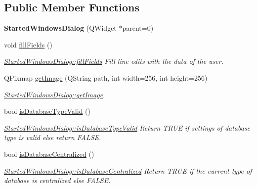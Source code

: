 \subsection*{Public Member Functions}
\begin{DoxyCompactItemize}
\item 
\hypertarget{classGui_1_1Dialogs_1_1StartedWindowsDialog_a978449729fbfc503919f29d1d2c7b4f6}{{\bfseries Started\-Windows\-Dialog} (Q\-Widget $\ast$parent=0)}\label{classGui_1_1Dialogs_1_1StartedWindowsDialog_a978449729fbfc503919f29d1d2c7b4f6}

\item 
\hypertarget{classGui_1_1Dialogs_1_1StartedWindowsDialog_a30d97171779c86ecc497ef6990829fca}{void \hyperlink{classGui_1_1Dialogs_1_1StartedWindowsDialog_a30d97171779c86ecc497ef6990829fca}{fill\-Fields} ()}\label{classGui_1_1Dialogs_1_1StartedWindowsDialog_a30d97171779c86ecc497ef6990829fca}

\begin{DoxyCompactList}\small\item\em \hyperlink{classGui_1_1Dialogs_1_1StartedWindowsDialog_a30d97171779c86ecc497ef6990829fca}{Started\-Windows\-Dialog\-::fill\-Fields} Fill line edits with the data of the user. \end{DoxyCompactList}\item 
Q\-Pixmap \hyperlink{classGui_1_1Dialogs_1_1StartedWindowsDialog_ae3e9ade2f5949d5fb57e06c54106609f}{get\-Image} (Q\-String path, int width=256, int height=256)
\begin{DoxyCompactList}\small\item\em \hyperlink{classGui_1_1Dialogs_1_1StartedWindowsDialog_ae3e9ade2f5949d5fb57e06c54106609f}{Started\-Windows\-Dialog\-::get\-Image}. \end{DoxyCompactList}\item 
bool \hyperlink{classGui_1_1Dialogs_1_1StartedWindowsDialog_ad582a62ec4204c2ef5081c5431824491}{is\-Database\-Type\-Valid} ()
\begin{DoxyCompactList}\small\item\em \hyperlink{classGui_1_1Dialogs_1_1StartedWindowsDialog_ad582a62ec4204c2ef5081c5431824491}{Started\-Windows\-Dialog\-::is\-Database\-Type\-Valid} Return T\-R\-U\-E if settings of database type is valid else return F\-A\-L\-S\-E. \end{DoxyCompactList}\item 
bool \hyperlink{classGui_1_1Dialogs_1_1StartedWindowsDialog_ac5127ad449080835c6f3bb572fb3e481}{is\-Database\-Centralized} ()
\begin{DoxyCompactList}\small\item\em \hyperlink{classGui_1_1Dialogs_1_1StartedWindowsDialog_ac5127ad449080835c6f3bb572fb3e481}{Started\-Windows\-Dialog\-::is\-Database\-Centralized} Return T\-R\-U\-E if the current type of database is centralized else F\-A\-L\-S\-E. \end{DoxyCompactList}\end{DoxyCompactItemize}


